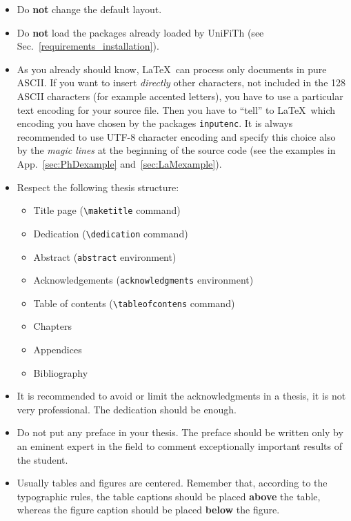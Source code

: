 \documentclass[a5paper,11pt]{article}
\newcommand{\bs}{\textbackslash}
\begin{document}
\begin{itemize}

\item Do \textbf{not} change the default layout.

\item Do \textbf{not} load the packages already loaded by \textsf{UniFiTh} (see Sec.~\ref{requirements_installation}).

\item As you already should know, \LaTeX\ can process only documents
in pure ASCII. If you want to insert \emph{directly} other characters, not included in the 128 ASCII characters (for example accented letters), you have to use a particular text encoding for your source file. Then you have to ``tell'' to \LaTeX\ which encoding you have chosen by the packages \texttt{inputenc}. It is always recommended to use UTF-8 character encoding and specify this choice also by the \emph{magic lines} at the beginning of the source code (see the examples in App.~\ref{sec:PhDexample} and~\ref{sec:LaMexample}).

\item Respect the following thesis structure:

\begin{itemize}
\item Title page (\texttt{\bs maketitle} command)
\item Dedication (\texttt{\bs dedication} command)
\item Abstract (\texttt{abstract} environment)
\item Acknowledgements (\texttt{acknowledgments} environment)
\item Table of contents (\texttt{\bs tableofcontens} command)
\item Chapters
\item Appendices
\item Bibliography
\end{itemize}

\item It is recommended to avoid or limit the acknowledgments in a thesis, it 
is not very professional. The dedication should be enough.

\item Do not put any preface in your thesis. The preface should be written only by an eminent expert in the field to comment exceptionally important results of the student.

\item Usually tables and figures are centered. Remember that, according to the typographic rules, the table captions should be placed \textbf{above} the table, whereas the figure caption should be placed \textbf{below} the figure.


\end{itemize}
\end{document}
